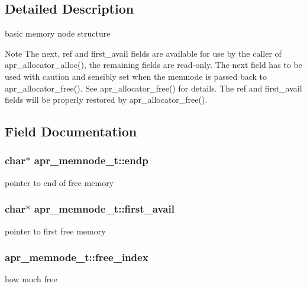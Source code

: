 \subsection{Detailed Description}
basic memory node structure \begin{DoxyNote}{Note}
The next, ref and first\+\_\+avail fields are available for use by the caller of apr\+\_\+allocator\+\_\+alloc(), the remaining fields are read-\/only. The next field has to be used with caution and sensibly set when the memnode is passed back to apr\+\_\+allocator\+\_\+free(). See apr\+\_\+allocator\+\_\+free() for details. The ref and first\+\_\+avail fields will be properly restored by apr\+\_\+allocator\+\_\+free(). 
\end{DoxyNote}


\subsection{Field Documentation}
\subsubsection[{\texorpdfstring{endp}{endp}}]{\setlength{\rightskip}{0pt plus 5cm}char$\ast$ apr\+\_\+memnode\+\_\+t\+::endp}\hypertarget{structapr__memnode__t_a35c9bf71f1cc680929f857176b547a05}{}\label{structapr__memnode__t_a35c9bf71f1cc680929f857176b547a05}
pointer to end of free memory 
\subsubsection[{\texorpdfstring{first\+\_\+avail}{first_avail}}]{\setlength{\rightskip}{0pt plus 5cm}char$\ast$ apr\+\_\+memnode\+\_\+t\+::first\+\_\+avail}\hypertarget{structapr__memnode__t_a863e7980225e46678881271c4c803e4c}{}\label{structapr__memnode__t_a863e7980225e46678881271c4c803e4c}
pointer to first free memory 
\subsubsection[{\texorpdfstring{free\+\_\+index}{free_index}}]{ apr\+\_\+memnode\+\_\+t\+::free\+\_\+index}\hypertarget{structapr__memnode__t_af63769f30f6eb9d72e4b24050bd7a9d9}{}\label{structapr__memnode__t_af63769f30f6eb9d72e4b24050bd7a9d9}
how much free 
